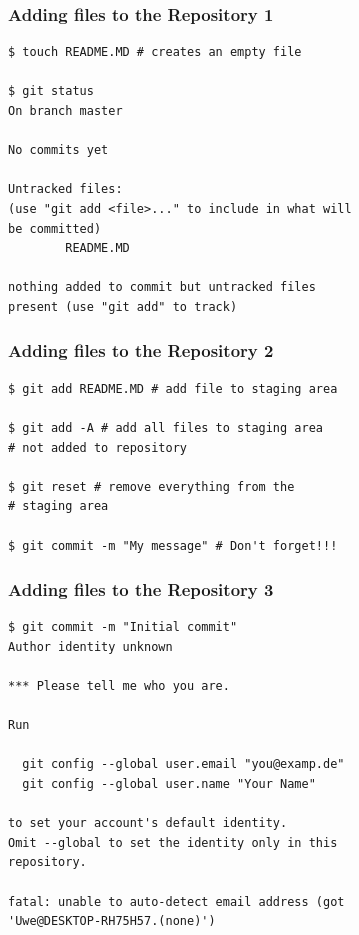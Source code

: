 \documentclass[12pt,english]{beamer}
\begin{document}
\begin{frame}[containsverbatim]
\frametitle{Adding files to the Repository 1} %

\begin{lstlisting}
$ touch README.MD # creates an empty file

$ git status
On branch master

No commits yet

Untracked files:
(use "git add <file>..." to include in what will 
be committed)
        README.MD

nothing added to commit but untracked files 
present (use "git add" to track)
\end{lstlisting}

\end{frame}


\begin{frame}[containsverbatim]
\frametitle{Adding files to the Repository 2} 

\begin{lstlisting}
$ git add README.MD # add file to staging area

$ git add -A # add all files to staging area
# not added to repository

$ git reset # remove everything from the
# staging area

$ git commit -m "My message" # Don't forget!!!
\end{lstlisting}

\end{frame}


\begin{frame}[containsverbatim]
\frametitle{Adding files to the Repository 3} 

\begin{lstlisting}
$ git commit -m "Initial commit"
Author identity unknown

*** Please tell me who you are.

Run

  git config --global user.email "you@examp.de"
  git config --global user.name "Your Name"

to set your account's default identity.
Omit --global to set the identity only in this 
repository.

fatal: unable to auto-detect email address (got 
'Uwe@DESKTOP-RH75H57.(none)')
\end{lstlisting}

\end{frame}
\end{document}
